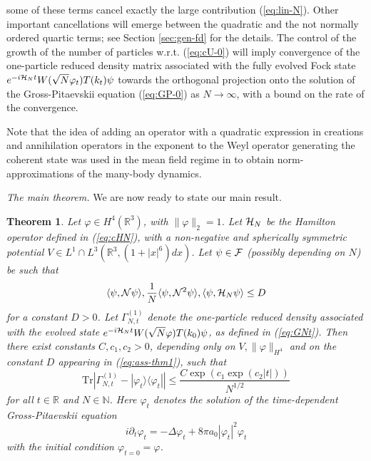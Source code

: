 \documentclass[11pt,a4paper]{article}
\newtheorem{thm}{Theorem}[section]  %
\newcommand{\bR}{{\mathbb R}}
\newcommand{\bN}{{\mathbb N}}
\newcommand{\tr}{\mbox{Tr}}
\newcommand{\cF}{{\cal F}}
\newcommand{\cH}{{\cal H}}
\newcommand{\cN}{{\cal N}}
\begin{document}
some of these terms cancel exactly the large contribution (\ref{eq:lin-N}). Other important cancellations will emerge between the quadratic and the not normally ordered quartic terms; see Section \ref{sec:gen-fd} for the details. The control of the growth of the number of particles w.r.t. (\ref{eq:cU-0}) will imply convergence of the one-particle reduced density matrix associated with the fully evolved Fock state $e^{-i \cH_N t} W(\sqrt{N} \varphi_t) T(k_t) \psi$ towards the orthogonal projection onto the solution of the Gross-Pitaevskii equation (\ref{eq:GP-0}) as $N \to \infty$, with a bound on the rate of the convergence.

Note that the idea of adding an operator with a quadratic expression in creations and annihilation operators in the exponent to the Weyl operator generating the coherent state was used in the mean field regime in \cite{GMM2010} to obtain norm-approximations of the many-body dynamics. 

\bigskip

{\it The main theorem.} We are now ready to state our main result. 
\begin{thm}\label{thm:main}
Let $\varphi \in H^4 (\bR^3)$, with $\| \varphi \|_2 =1$. Let $\cH_N$ be the
Hamilton operator defined in (\ref{eq:cHN}), with a non-negative and
spherically symmetric potential $V \in L^1\cap L^3 (\bR^3, (1+|x|^6) dx)$. Let $\psi \in \cF$ (possibly depending on $N$) be such that
\begin{equation}\label{eq:ass-thm1} \langle \psi , \cN \psi \rangle ,  \frac{1}{N} \langle \psi , \cN^2 \psi \rangle, \langle \psi, \cH_N \psi \rangle \leq D \end{equation}
for a constant $D>0$. Let $\Gamma_{N,t}^{(1)}$ denote the one-particle reduced density associated with the evolved state $e^{-i\cH_N t} W(\sqrt{N} \varphi) T(k_0) \psi$, as defined in (\ref{eq:GNt}). Then there exist constants $C, c_1, c_2 >0$, depending only on $V, \| \varphi \|_{H^4}$ and on the constant $D$ appearing in (\ref{eq:ass-thm1}), such that
\begin{equation}\label{eq:mt} \tr \left| \Gamma_{N,t}^{(1)} - |\varphi_t\rangle \langle \varphi_t| \right| \leq \frac{C \exp (c_1 \exp (c_2 |t|))}{N^{1/2}} \end{equation}
for all $t \in \bR$ and $N \in \bN$. Here $\varphi_t$ denotes the solution of the time-dependent Gross-Pitaevskii equation
\begin{equation}\label{eq:GP} i\partial_t \varphi_t = -\Delta \varphi_t + 8 \pi a_0 |\varphi_t|^2 \varphi_t \end{equation}
with the initial condition $\varphi_{t=0} =\varphi$.
\end{thm}
\end{document}
